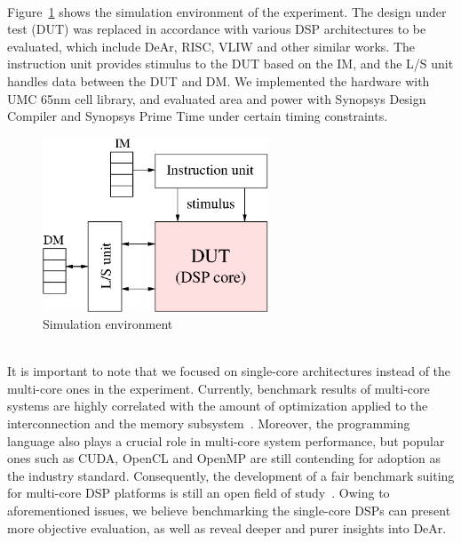 \\\indent Figure~\ref{fig:sim} shows the simulation environment of the experiment.
The design under test (DUT) was replaced in accordance with various DSP architectures to be evaluated, 
which include DeAr, RISC, VLIW and other similar works.
The instruction unit provides stimulus to the DUT based on the IM,
and the L/S unit handles data between the DUT and DM.
We implemented the hardware with UMC 65nm cell library, 
and evaluated area and power with Synopsys Design Compiler and Synopsys Prime Time under certain timing constraints.
\vspace{\textfig}
\begin{figure}[!ht] 
    \centering
    \includegraphics[width=0.6\textwidth]{./figs/sim.eps}
    \caption{Simulation environment}
    \label{fig:sim}
\end{figure}
\\\indent It is important to note that we focused on single-core architectures instead of the multi-core ones in the experiment.
Currently, benchmark results of multi-core systems are highly correlated with the amount of optimization applied to the interconnection and the memory subsystem~\cite{trends}.
Moreover, the programming language also plays a crucial role in multi-core system performance, 
but popular ones such as CUDA, OpenCL and OpenMP are still contending for adoption as the industry standard.
Consequently, the development of a fair benchmark suiting for multi-core DSP platforms is still an open field of study~\cite{landscape}.
Owing to aforementioned issues, we believe benchmarking the single-core DSPs can present more objective evaluation, 
as well as reveal deeper and purer insights into DeAr.
